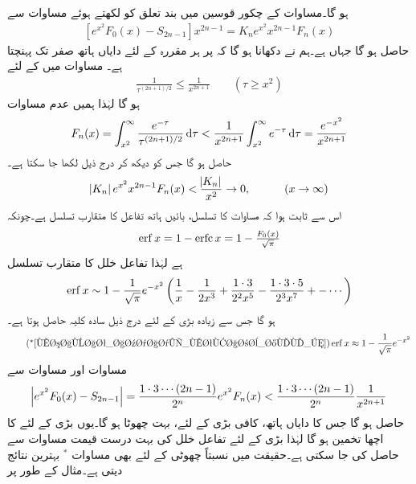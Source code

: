 ہو گا۔مساوات  کے چکور قوسین میں بند تعلق کو  لکھتے ہوئے مساوات  سے
\begin{align}\label{مساوات_اعدادی_متقارب_خلل_ث}
[e^{x^2}F_0(x)-S_{2n-1}]x^{2n-1}=K_ne^{x^2}x^{2n-1}F_n(x)
\end{align}
حاصل ہو گا جہاں  ہے۔ہم نے دکھانا ہو گا کہ  پر ہر مقررہ  کے لئے دایاں ہاتھ صفر تک پہنچتا ہے۔ مساوات  میں  کے لئے
\begin{align*}
\frac{1}{\tau^{(2n+1)/2}}\le \frac{1}{x^{2n+1}} \quad \quad (\tau \ge x^2)
\end{align*} 
ہو گا لہٰذا ہمیں عدم مساوات
\begin{align}\label{مساوات_اعدادی_متقارب_خلل_ج}
F_n(x)=\int_{x^2}^{\infty} \frac{e^{-\tau}}{\tau^{(2n+1)/2}}\dif \tau < \frac{1}{x^{2n+1}}\int_{x^2}^{\infty} e^{-\tau}\dif \tau =\frac{e^{-x^2}}{x^{2n+1}}
\end{align}
 حاصل ہو گا جس کو دیکھ کر درج ذیل لکھا جا سکتا ہے۔
\begin{align*}
\abs{K_n}e^{x^2}x^{2n-1}F_n(x)<\frac{\abs{K_n}}{x^2}\to 0,\quad \quad \quad (x\to \infty)
\end{align*}
اس سے ثابت ہوا کہ مساوات   کا تسلسل، بائیں ہاتھ تفاعل کا متقارب تسلسل ہے۔چونکہ
\begin{align*}
\operatorname{erf} x=1-\operatorname{erfc} x=1-\tfrac{F_0(x)}{\sqrt{\pi}}
\end{align*}
ہے لہٰذا تفاعل خلل کا متقارب تسلسل
\begin{align}\label{مساوات_اعدادی_متقارب_خلل_چ}
\operatorname{erf} x\sim 1-\frac{1}{\sqrt{\pi}} e^{-x^2}\left(\frac{1}{x}-\frac{1}{2x^3}+\frac{1\cdot 3}{2^2x^5}-\frac{1\cdot3\cdot5}{2^3x^7}+-\cdots\right)
\end{align}
ہو گا جس سے زیادہ بڑی  کے لئے درج ذیل سادہ کلیہ حاصل ہوتا ہے۔
\begin{align*}\tag*{(${}^*$\ref{مساوات_اعدادی_متقارب_خلل_چ})}
\erf x \approx 1-\frac{1}{\sqrt{\pi}} e^{-x^2}
\end{align*}
مساوات  اور مساوات  سے
\begin{align*}
\abs{e^{x^2}F_0(x)-S_{2n-1}}=\frac{1\cdot3\cdots (2n-1)}{2^n}e^{x^2}F_n(x)<\frac{1\cdot 3\cdots(2n-1)}{2^n}\frac{1}{x^{2n+1}}
\end{align*}
حاصل ہو گا جس کا دایاں ہاتھ، کافی بڑی  کے لئے، بہت چھوٹا ہو گا۔یوں بڑی  کے لئے  کا اچھا تخمین  ہو گا لہٰذا بڑی  کے لئے تفاعل خلل کی بہت درست قیمت  مساوات  سے حاصل کی جا سکتی ہے۔حقیقت میں نسبتاً چھوٹی  کے لئے بھی مساوات $^*$ بہترین نتائج دیتی ہے۔مثال کے طور پر
